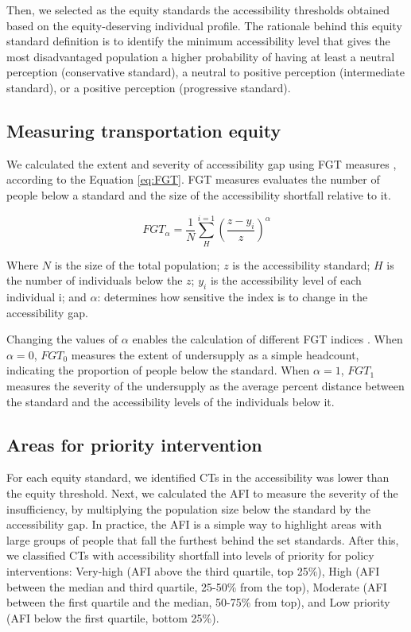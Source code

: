 \documentclass[preprint, 3p,
authoryear]{elsarticle} %
\begin{document}
Then, we selected as the equity standards the accessibility thresholds
obtained based on the equity-deserving individual profile. The rationale
behind this equity standard definition is to identify the minimum
accessibility level that gives the most disadvantaged population a
higher probability of having at least a neutral perception (conservative
standard), a neutral to positive perception (intermediate standard), or
a positive perception (progressive standard).

\subsection{Measuring transportation
equity}\label{measuring-transportation-equity}

We calculated the extent and severity of accessibility gap using FGT
measures \citep{foster2010}, according to the Equation \ref{eq:FGT}. FGT
measures evaluates the number of people below a standard and the size of
the accessibility shortfall relative to it.

\begin{equation}
\label{eq:FGT}
FGT_\alpha = \frac{1}{N}\sum_{H}^{i=1}\left(\frac{z-y_i}{z}  \right)^{\alpha}
\end{equation}

Where \(N\) is the size of the total population; \(z\) is the
accessibility standard; \(H\) is the number of individuals below the
\(z\); \(y_i\) is the accessibility level of each individual i; and
\(\alpha\): determines how sensitive the index is to change in the
accessibility gap.

Changing the values of \(\alpha\) enables the calculation of different
FGT indices \citep{karner2024}. When \(\alpha = 0\), \(FGT_0\) measures
the extent of undersupply as a simple headcount, indicating the
proportion of people below the standard. When \(\alpha = 1\), \(FGT_1\)
measures the severity of the undersupply as the average percent distance
between the standard and the accessibility levels of the individuals
below it.

\subsection{Areas for priority
intervention}\label{areas-for-priority-intervention}

For each equity standard, we identified CTs in the accessibility was
lower than the equity threshold. Next, we calculated the AFI
\citep{martens2016} to measure the severity of the insufficiency, by
multiplying the population size below the standard by the accessibility
gap. In practice, the AFI is a simple way to highlight areas with large
groups of people that fall the furthest behind the set standards. After
this, we classified CTs with accessibility shortfall into levels of
priority for policy interventions: Very-high (AFI above the third
quartile, top 25\%), High (AFI between the median and third quartile,
25-50\% from the top), Moderate (AFI between the first quartile and the
median, 50-75\% from top), and Low priority (AFI below the first
quartile, bottom 25\%).
\end{document}
